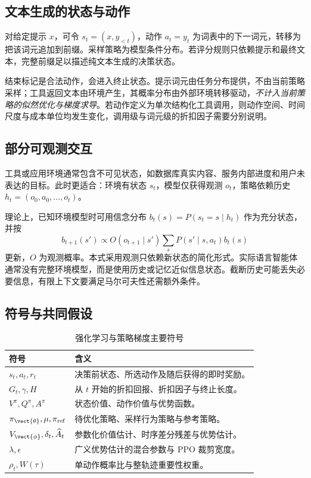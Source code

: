 \documentclass[../textbook.tex]{subfiles}
\begin{document}
\subsection{文本生成的状态与动作}
对给定提示 $x$，可令 $s_t=(x,y_{<t})$，动作 $a_t=y_t$ 为词表中的下一词元，转移为把该词元追加到前缀。采样策略为模型条件分布。若评分规则只依赖提示和最终文本，完整前缀足以描述纯文本生成的决策状态。

结束标记是合法动作，会进入终止状态。提示词元由任务分布提供，不由当前策略采样；工具返回文本由环境产生，其概率分布由外部环境转移驱动，\emph{不计入当前策略的似然优化与梯度求导}。若动作定义为单次结构化工具调用，则动作空间、时间尺度与成本单位均发生变化，调用级与词元级的折扣因子需要分别说明。

\subsection{部分可观测交互}
工具或应用环境通常包含不可见状态，如数据库真实内容、服务内部进度和用户未表达的目标。此时更适合：环境有状态 $s_t$，模型仅获得观测 $o_t$，策略依赖历史 $h_t=(o_0,a_0,\ldots,o_t)$。

理论上，已知环境模型时可用信念分布 $b_t(s)=P(s_t=s\mid h_t)$ 作为充分状态，并按
\begin{equation}
 b_{t+1}(s')\propto O(o_{t+1}\mid s')\sum_sP(s'\mid s,a_t)b_t(s)
\end{equation}
更新，$O$ 为观测概率。本式采用观测只依赖新状态的简化形式。实际语言智能体通常没有完整环境模型，而是使用历史或记忆近似信息状态。截断历史可能丢失必要信息，有限上下文要满足马尔可夫性还需额外条件。

\subsection{符号与共同假设}
\begin{table}[htbp]
\centering
\caption{强化学习与策略梯度主要符号}
\label{tab:rl-symbols}
\begin{tabular}{ll}
\toprule 符号 & 含义\\\midrule
$s_t,a_t,r_t$ & 决策前状态、所选动作及随后获得的即时奖励。\\
$G_t,\gamma,H$ & 从 $t$ 开始的折扣回报、折扣因子与终止长度。\\
$V^\pi,Q^\pi,A^\pi$ & 状态价值、动作价值与优势函数。\\
$\pi_{\vect{\theta}},\mu,\pi_{\mathrm{ref}}$ & 待优化策略、采样行为策略与参考策略。\\
$V_{\vect{\phi}},\delta_t,\widehat A_t$ & 参数化价值估计、时序差分残差与优势估计。\\
$\lambda,\epsilon$ & 广义优势估计的混合参数与 PPO 裁剪宽度。\\
$\rho_t,W(\tau)$ & 单动作概率比与整轨迹重要性权重。\\
\bottomrule
\end{tabular}
\end{table}
\end{document}
